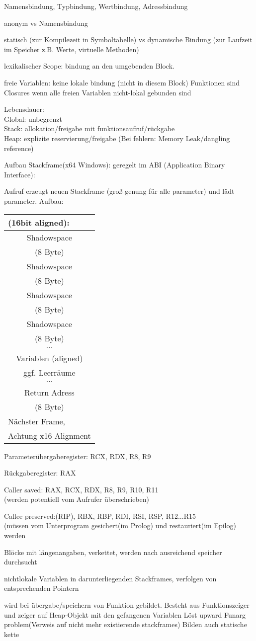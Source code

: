 Namensbindung, Typbindung, Wertbindung, Adressbindung

anonym vs Namensbindung

statisch (zur Kompilezeit in Symboltabelle) vs dynamische Bindung (zur Laufzeit im Speicher z.B. Werte, virtuelle Methoden)

lexikalischer Scope: bindung an den umgebenden Block.

freie Variablen: keine lokale bindung (nicht in diesem Block)
Funktionen sind Closures wenn alle freien Variablen nicht-lokal gebunden sind

Lebensdauer: \\
Global: unbegrenzt\\
Stack: allokation/freigabe mit funktionsaufruf/rückgabe\\
Heap: explizite reservierung/freigabe (Bei fehlern: Memory Leak/dangling reference)

Aufbau Stackframe(x64 Windows): geregelt im ABI (Application Binary Interface):

Aufruf erzeugt neuen Stackframe (groß genung für alle parameter) und lädt parameter. Aufbau:

\newcommand{\shadowspace}{\hline
Shadowspace\\
(8 Byte)\\}
\begin{tabular}{|c|}
\multicolumn{1}{l}{(16bit aligned):}\\
\shadowspace
\shadowspace
\shadowspace
\shadowspace
\hline
$\cdots$\\
Variablen (aligned)\\
ggf. Leerräume\\
$\cdots$ \\
\hline
Return Adress \\
(8 Byte)\\
\hline
\multicolumn{1}{l}{Nächster Frame,} \\
\multicolumn{1}{l}{Achtung x16 Alignment}
\end{tabular}
Parameterübergaberegister: RCX, RDX, R8, R9

Rückgaberegister: RAX 

Caller saved: RAX, RCX, RDX, R8, R9, R10, R11 \\
(werden potentiell vom Aufrufer überschrieben)

Callee preserved:(RIP), RBX, RBP, RDI, RSI, RSP, R12...R15 \\
(müssen vom Unterprogram gesichert(im Prolog) und restauriert(im Epilog) werden

Blöcke mit längenangaben, verkettet, werden nach ausreichend speicher durchsucht

 nichtlokale Variablen in darunterliegenden Stackframes, verfolgen von entsprechenden Pointern

 wird bei übergabe/speichern von Funktion gebildet. Besteht aus Funktionszeiger und zeiger auf Heap-Objekt mit den gefangenen Variablen
Löst upward Funarg problem(Verweis auf nicht mehr existierende stackframes)
Bilden auch statische kette



